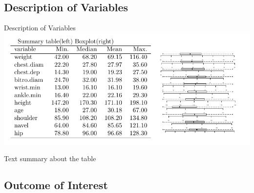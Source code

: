 \documentclass[table]{beamer}\usepackage[]{graphicx}\usepackage[]{color}
\begin{document}

\subsection{Description of Variables}

\begin{frame}{Description of Variables}
\includegraphics[width=\textwidth]{summary_table}

Text summary about the table

\end{frame}



\subsection{Outcome of Interest}

\end{document}
